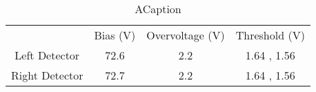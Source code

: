 \begin{table}
\label{ALabel}
\caption{ACaption}
\begin{tabular}{cccc}
& Bias (V) & Overvoltage (V) & Threshold (V) \\
Left Detector  &     72.6 &             2.2 &   1.64 , 1.56 \\
Right Detector &     72.7 &             2.2 &   1.64 , 1.56 \\
\end{tabular}
\end{table}

